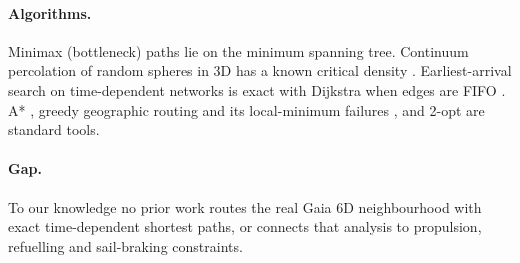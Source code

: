 \paragraph{Algorithms.} Minimax (bottleneck) paths lie on the minimum spanning
tree. Continuum percolation of random spheres in 3D has a known critical
density \cite{lorenz2001precise}. Earliest-arrival search on time-dependent
networks is exact with Dijkstra when edges are FIFO
\cite{cooke1966shortest,kaufman1993fastest}. A* \cite{hart1968formal}, greedy
geographic routing and its local-minimum failures \cite{bose2001routing}, and
2-opt \cite{croes1958method} are standard tools.

\paragraph{Gap.} To our knowledge no prior work routes the real Gaia 6D
neighbourhood with exact time-dependent shortest paths, or connects that
analysis to propulsion, refuelling and sail-braking constraints.
